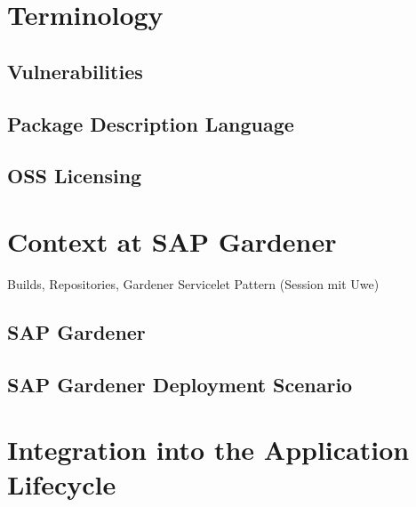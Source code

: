

\section{Terminology}
\subsection{Vulnerabilities}
\subsection{Package Description Language}
\subsection{OSS Licensing}
\section{Context at SAP Gardener}
Builds, Repositories, Gardener Servicelet Pattern (Session mit Uwe)
\subsection{SAP Gardener}
\subsection{SAP Gardener Deployment Scenario}
\section{Integration into the Application Lifecycle}